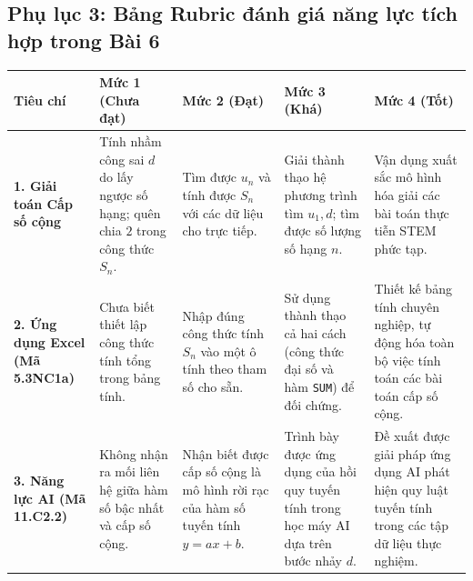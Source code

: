 \documentclass[12pt, a4paper]{article}
\begin{document}
\subsection*{Phụ lục 3: Bảng Rubric đánh giá năng lực tích hợp trong Bài 6}


\begin{center}
\begin{tabularx}{\linewidth}{|p{3.2cm}|X|X|X|X|}
\hline
\textbf{Tiêu chí} & \textbf{Mức 1 (Chưa đạt)} & \textbf{Mức 2 (Đạt)} & \textbf{Mức 3 (Khá)} & \textbf{Mức 4 (Tốt)} \\
\hline
\textbf{1. Giải toán Cấp số cộng} & Tính nhầm công sai $d$ do lấy ngược số hạng; quên chia $2$ trong công thức $S_n$. & Tìm được $u_n$ và tính được $S_n$ với các dữ liệu cho trực tiếp. & Giải thành thạo hệ phương trình tìm $u_1, d$; tìm được số lượng số hạng $n$. & Vận dụng xuất sắc mô hình hóa giải các bài toán thực tiễn STEM phức tạp. \\
\hline
\textbf{2. Ứng dụng Excel (Mã 5.3NC1a)} & Chưa biết thiết lập công thức tính tổng trong bảng tính. & Nhập đúng công thức tính $S_n$ vào một ô tính theo tham số cho sẵn. & Sử dụng thành thạo cả hai cách (công thức đại số và hàm \texttt{SUM}) để đối chứng. & Thiết kế bảng tính chuyên nghiệp, tự động hóa toàn bộ việc tính toán các bài toán cấp số cộng. \\
\hline
\textbf{3. Năng lực AI (Mã 11.C2.2)} & Không nhận ra mối liên hệ giữa hàm số bậc nhất và cấp số cộng. & Nhận biết được cấp số cộng là mô hình rời rạc của hàm số tuyến tính $y = ax + b$. & Trình bày được ứng dụng của hồi quy tuyến tính trong học máy AI dựa trên bước nhảy $d$. & Đề xuất được giải pháp ứng dụng AI phát hiện quy luật tuyến tính trong các tập dữ liệu thực nghiệm. \\
\hline
\end{tabularx}
\end{center}
\end{document}
